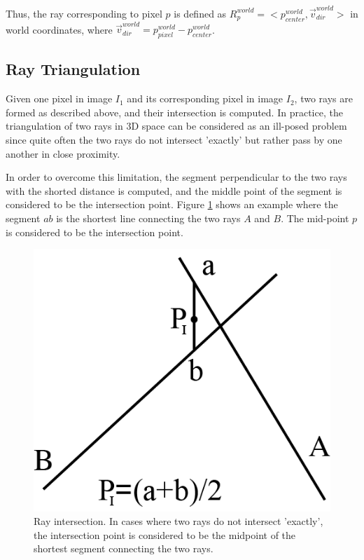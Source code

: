 \documentclass[final,12pt,3p]{elsarticle}
\begin{document}
Thus, the ray corresponding to pixel $p$ is defined as $R_{p}^{world} = < p_{center}^{world}, \vec{v}_{dir}^{world}>$ in world coordinates, where $\vec{v}_{dir}^{world} = p_{pixel}^{world} - p_{center}^{world}$.

\subsection{Ray Triangulation}
\label{subsec:ray_triangulation}

Given one pixel in image $I_{1}$ and its corresponding pixel in image $I_{2}$, two rays are formed as described above, and their intersection is computed. In practice, the triangulation of two rays in 3D space can be considered as an ill-posed problem since quite often the two rays do not intersect 'exactly' but rather pass by one another in close proximity. 

In order to overcome this limitation, the segment perpendicular to the two rays with the shorted distance is computed, and the middle point of the segment is considered to be the intersection point. Figure \ref{fig:raysNotInters} shows an example where the segment $ab$ is the shortest line connecting the two rays $A$ and $B$. The mid-point $p$ is considered to be the intersection point.

\begin{figure}[!ht]
	\centering
	\includegraphics[scale=1]{./images/not_inters_rays.png}
	\caption{\label{fig:raysNotInters} Ray intersection. In cases where two rays do not intersect 'exactly', the intersection point is considered to be the midpoint of the shortest segment connecting the two rays.}
\end{figure}
\end{document}

